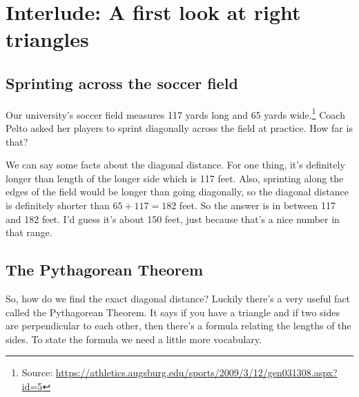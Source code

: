 
\section{Interlude: A first look at right triangles} 

\subsection*{Sprinting across the soccer field}

Our university's soccer field measures 117 yards long and 65 yards wide.\footnote{Source: \url{https://athletics.augsburg.edu/sports/2009/3/12/gen031308.aspx?id=5}}  Coach Pelto asked her players to sprint diagonally across the field at practice.  How far is that?

 \begin{center}
 \end{center}

We can say some facts about the diagonal distance.  For one thing, it's definitely longer than length of the longer side which is 117 feet.  Also, sprinting along the edges of the field would be longer than going diagonally, so the diagonal distance is definitely shorter than $65 + 117 = 182$ feet.  So the answer is in between 117 and 182 feet.  I'd guess it's about 150 feet, just because that's a nice number in that range.

\subsection*{The Pythagorean Theorem}

So, how do we find the exact diagonal distance?  Luckily there's a very useful fact called the Pythagorean Theorem.  It says if you have a triangle and if two sides are perpendicular to each other, then there's a formula relating the lengths of the sides. To state the formula we need a little more vocabulary.

